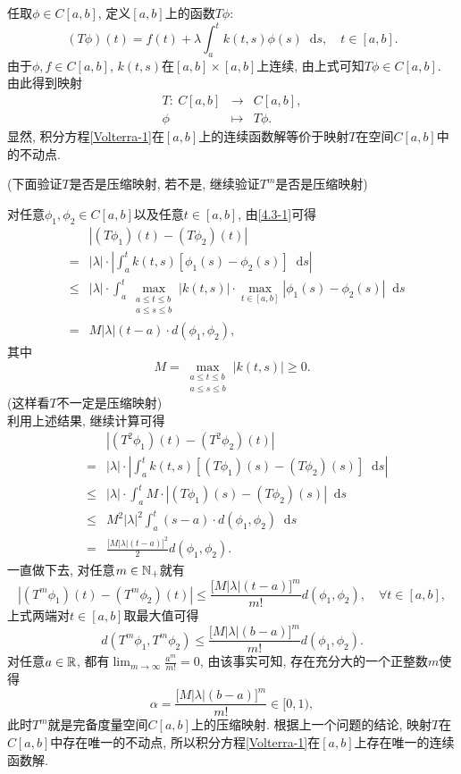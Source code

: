 \documentclass[UTF8,oneside,12pt]{article}  %
\makeatletter
\theoremstyle{DingLi1}
\numberwithin{equation}{section}
\theoremstyle{DingLi2}
\renewenvironment{proof}[1][\proofname]{\par%
\pushQED{\qed}%
\normalfont \topsep6\p@\@plus6\p@\relax%
\trivlist%
\item[\hskip\labelsep%
#1]\ignorespaces%
}{%
\popQED\endtrivlist\@endpefalse%
}
\renewcommand{\proofname}{\heiti\large\color{blue} 证明}%
\def\d{\mathop{}\!\mathrm{d}} %
\def\a{\alpha}
\makeatother
\begin{document}
\begin{proof}
任取$\phi\in C[a,b]$, 定义$[a,b]$上的函数$T\phi$:
\begin{equation}\label{4.3-1}
(T\phi)(t)=f(t)+\lambda \int_a^t k(t,s)\phi(s) \d s,\quad t\in [a,b].
\end{equation}
由于$\phi,f\in C[a,b]$, $k(t,s)$在$[a,b]\times [a,b]$上连续, 由上式可知$T\phi\in C[a,b]$. 由此得到映射
\begin{eqnarray*}
  T:\ C[a,b] &\to &C[a,b],\\
  \phi&\mapsto & T\phi.
\end{eqnarray*}
显然, 积分方程\eqref{Volterra-1}在$[a,b]$上的连续函数解等价于映射$T$在空间$C[a,b]$中的不动点.

(下面验证$T$是否是压缩映射, 若不是, 继续验证$T^m$是否是压缩映射)

对任意$\phi_1,\phi_2\in C[a,b]$以及任意$t\in [a,b]$, 由\eqref{4.3-1}可得
\begin{eqnarray*}
&&\left|(T\phi_1)(t)-(T\phi_2)(t)  \right|\\
&=&|\lambda|\cdot\left| \int_a^t k(t,s)\left[\phi_1(s)-\phi_2(s)\right] \d s\right|\\
&\leq &|\lambda|\cdot \int_a^t \max_{\substack{a\leq t\leq b\\a\leq s\leq  b}}|k(t,s)|\cdot \max_{t\in [a,b]}\left|\phi_1(s)-\phi_2(s)\right| \d s\\
&=&M|\lambda|(t-a)\cdot d(\phi_1,\phi_2),
\end{eqnarray*}
其中
$$M= \max_{\substack{a\leq t\leq b\\a\leq s\leq  b}}|k(t,s)|\geq 0.$$
(这样看$T$不一定是压缩映射)\\
利用上述结果, 继续计算可得
\begin{eqnarray*}
&&\left|(T^2\phi_1)(t)-(T^2\phi_2)(t)  \right|\\
&=&|\lambda|\cdot\left| \int_a^t k(t,s)\left[(T\phi_1)(s)-(T\phi_2)(s)\right] \d s\right|\\
&\leq &|\lambda|\cdot \int_a^t M\cdot\left|(T\phi_1)(s)-(T\phi_2)(s)\right| \d s\\
&\leq &M^2|\lambda|^2\int_a^t (s-a)\cdot d(\phi_1,\phi_2)\d s\\
&=&\frac{\big[M|\lambda|(t-a)\big]^2}{2}d(\phi_1,\phi_2).
\end{eqnarray*}
一直做下去, 对任意$m\in \Bbb{N}_+$就有
$$\left|(T^m\phi_1)(t)-(T^m\phi_2)(t)  \right|\leq \frac{\big[M|\lambda|(t-a)\big]^m}{m!}d(\phi_1,\phi_2),\quad \forall t\in [a,b],$$
上式两端对$t\in [a,b]$取最大值可得
\begin{equation*}
d\left(T^m\phi_1, T^m\phi_2  \right)\leq \frac{\big[M|\lambda|(b-a)\big]^m}{m!}d(\phi_1,\phi_2).
\end{equation*}
对任意$a\in \Bbb{R}$, 都有$\lim_{m\to \infty}\frac{a^m}{m!}=0$, 由该事实可知, 存在充分大的一个正整数$m$使得
$$\alpha =\frac{\big[M|\lambda|(b-a)\big]^m}{m!}\in [0,1),$$
此时$T^m$就是完备度量空间$C[a,b]$上的压缩映射. 根据上一个问题的结论, 映射$T$在$C[a,b]$中存在唯一的不动点, 所以积分方程\eqref{Volterra-1}在$[a,b]$上存在唯一的连续函数解.
\end{proof}
\end{document}
